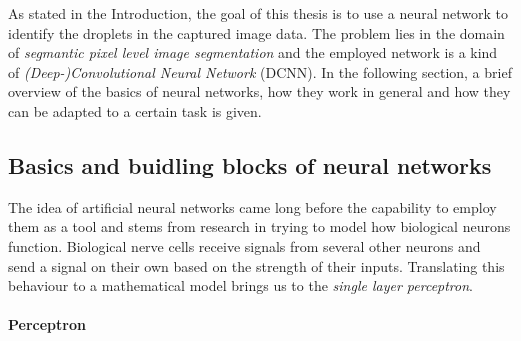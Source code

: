 As stated in the Introduction, the goal of this thesis is to use a neural network to identify the droplets in the captured image data. The problem lies in the domain of \emph{segmantic pixel level image segmentation} and the employed network is a kind of \emph{(Deep-)Convolutional Neural Network} (DCNN). In the following section, a brief overview of the basics of neural networks, how they work in general and how they can be adapted to a certain task is given. 

\subsection{Basics and buidling blocks of neural networks}
\label{sec:building_blocks}

The idea of artificial neural networks came long before the capability to employ them as a tool and stems from research in trying to model how biological neurons function. Biological nerve cells receive signals from several other neurons and send a signal on their own based on the strength of their inputs. Translating this behaviour to a mathematical model brings us to the \emph{single layer perceptron}.

\paragraph*{Perceptron}

